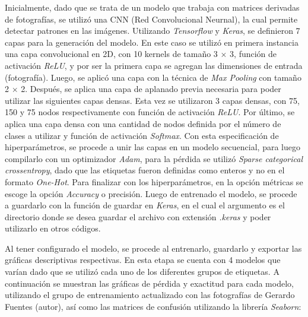 Inicialmente, dado que se trata de un modelo que trabaja con matrices derivadas de fotografías, se utilizó una CNN (Red Convolucional Neurnal), la cual permite detectar patrones en las imágenes. Utilizando \textit{Tensorflow} y \textit{Keras}, se definieron 7 capas para la generación del modelo. En este caso se utilizó en primera instancia una capa convolucional en 2D, con 10 kernels de tamaño 3 $\times$ 3, función de activación \textit{ReLU}, y por ser la primera capa se agregan las dimensiones de entrada (fotografía). Luego, se aplicó una capa con la técnica de \textit{Max Pooling} con tamaño 2 $\times$ 2. Después, se aplica una capa de aplanado previa necesaria para poder utilizar las siguientes capas densas. Esta vez se utilizaron 3 capas densas, con 75, 150 y 75 nodos respectivamente con función de activación \textit{ReLU}. Por último, se aplica una capa densa con una cantidad de nodos definida por el número de clases a utilizar y función de activación \textit{Softmax}. Con esta especificación de hiperparámetros, se procede a unir las capas en un modelo secuencial, para luego compilarlo con un optimizador \textit{Adam}, para la pérdida se utilizó \textit{Sparse categorical crossentropy}, dado que las etiquetas fueron definidas como enteros y no en el formato \textit{One-Hot}. Para finalizar con los hiperparámetros, en la opción métricas se escoge la opción \textit{Accuracy} o precisión. Luego de entrenado el modelo, se procede a guardarlo con la función de guardar en \textit{Keras}, en el cual el argumento es el directorio donde se desea guardar el archivo con extensión \textit{.keras} y poder utilizarlo en otros códigos.

Al tener configurado el modelo, se procede al entrenarlo, guardarlo y exportar las gráficas descriptivas respectivas. En esta etapa se cuenta con 4 modelos que varían dado que se utilizó cada uno de los diferentes grupos de etiquetas. A continuación se muestran las gráficas de pérdida y exactitud para cada modelo, utilizando el grupo de entrenamiento actualizado con las fotografías de Gerardo Fuentes (autor), así como las matrices de confusión utilizando la librería \textit{Seaborn}:


